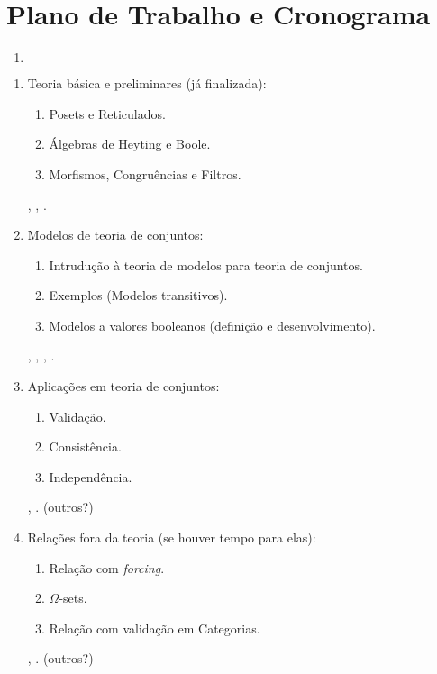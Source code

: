 \documentclass[12pt]{article}
\newenvironment{etapas}
    {
        \begin{enumerate}[label=]\item$ $
        \end{enumerate}
        \vspace{-1.5cm}
        \begin{enumerate}[label={\bf\arabic*${}^a$ Etapa:}, align=left]
    }
    {\end{enumerate}}
\begin{document}
        \section{Plano de Trabalho e Cronograma}
            \begin{etapas}
                \item {\sc Teoria básica e preliminares} (já finalizada):
                \begin{enumerate}[label=$*$]
                    \item Posets e Reticulados.
                    \item Álgebras de Heyting e Boole.
                    \item Morfismos, Congruências e Filtros.
                \end{enumerate}
                \cite{Bell}, \cite{Jech}, \cite{Miraglia}.
                
                \item {\sc Modelos de teoria de conjuntos}:       
                \begin{enumerate}[label=$*$]
                    \item Intrudução à teoria de modelos para teoria de conjuntos.
                    \item Exemplos (Modelos transitivos).
                    \item Modelos a valores booleanos (definição e desenvolvimento).
                \end{enumerate}
                \cite{Bell}, \cite{Drake}, \cite{Jech}, \cite{Kunen}.
                
                \item {\sc Aplicações em teoria de conjuntos}:    
                \begin{enumerate}[label=$*$]
                    \item Validação.
                    \item Consistência.
                    \item Independência.
                \end{enumerate}
                \cite{Bell}, \cite{Jech}. (outros?)
    
                \item {\sc Relações fora da teoria} (se houver tempo para elas):
                \begin{enumerate}[label=$*$]
                    \item Relação com {\em forcing}.
                    \item $\Omega$-{\sc sets}.
                    \item Relação com validação em Categorias.
                \end{enumerate}
                \cite{Bell}, \cite{Jech}. (outros?)
            \end{etapas}
    
\end{document}
